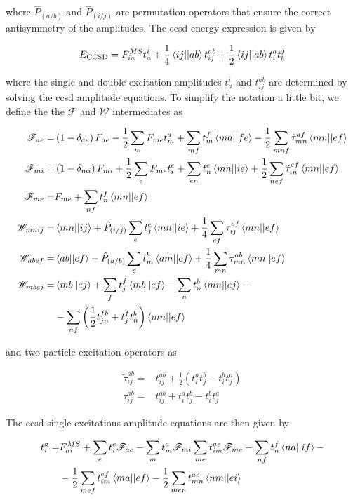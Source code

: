\documentclass[open=any,parskip=half,11pt]{scrbook}
\begin{document}
where \(\hat{P}_{(a/b)}\) and \(\hat{P}_{(i/j)}\) are permutation operators that ensure the correct antisymmetry of the amplitudes. The \acrshort{ccsd} energy expression is given by

\begin{equation}
E_{\text{CCSD}}=F_{ia}^{MS}t_a^i+\frac{1}{4}\braket{ij||ab}t_{ij}^{ab}+\frac{1}{2}\braket{ij||ab}t_{i}^{a}t_{b}^{j}
\end{equation}

where the single and double excitation amplitudes \(t_a^i\) and \(t_{ij}^{ab}\) are determined by solving the \acrshort{ccsd} amplitude equations. To simplify the notation a little bit, we define the the \(\mathscr{F}\) and \(\mathscr{W}\) intermediates as

\begin{align}
\mathscr{F}_{ae}=&\left(1-\delta_{ae}\right)F_{ae}-\frac{1}{2}\sum_mF_{me}t_m^a+\sum_{mf}t_m^f\braket{ma||fe}-\frac{1}{2}\sum_{mnf}\tilde{\tau}_{mn}^{af}\braket{mn||ef} \\
\mathscr{F}_{mi}=&\left(1-\delta_{mi}\right)F_{mi}+\frac{1}{2}\sum_eF_{me}t_i^e+\sum_{en}t_n^e\braket{mn||ie}+\frac{1}{2}\sum_{nef}\tilde{\tau}_{in}^{ef}\braket{mn||ef} \\
\mathscr{F}_{me}=&F_{me}+\sum_{nf}t_n^f\braket{mn||ef} \\
\mathscr{W}_{mnij}=&\braket{mn||ij}+\hat{P}_{(i/j)}\sum_et_j^e\braket{mn||ie}+\frac{1}{4}\sum_{ef}\tau_{ij}^{ef}\braket{mn||ef} \\
\mathscr{W}_{abef}=&\braket{ab||ef}-\hat{P}_{(a/b)}\sum_et_m^b\braket{am||ef}+\frac{1}{4}\sum_{mn}\tau_{mn}^{ab}\braket{mn||ef} \\
\mathscr{W}_{mbej}=&\braket{mb||ej}+\sum_ft_j^f\braket{mb||ef}-\sum_nt_n^b\braket{mn||ej}- \\
&-\sum_{nf}\left(\frac{1}{2}t_{jn}^{fb}+t_j^ft_n^b\right)\braket{mn||ef}
\end{align}

and two-particle excitation operators as

\begin{align}
\tilde{\tau}_{ij}^{ab}=&t_{ij}^{ab}+\frac{1}{2}\left(t_i^at_j^b-t_i^bt_j^a\right) \\
\tau_{ij}^{ab}=&t_{ij}^{ab}+t_i^at_j^b-t_i^bt_j^a
\end{align}

The \acrshort{ccsd} single excitations amplitude equations are then given by

\begin{align}
t_i^a=&F_{ai}^{MS}+\sum_et_i^e\mathscr{F}_{ae}-\sum_mt_m^a\mathscr{F}_{mi}\sum_{me}t_{im}^{ae}\mathscr{F}_{me}-\sum_{nf}t_n^f\braket{na||if}- \\
&-\frac{1}{2}\sum_{mef}t_{im}^{ef}\braket{ma||ef}-\frac{1}{2}\sum_{men}t_{mn}^{ae}\braket{nm||ei}
\end{align}
\end{document}

